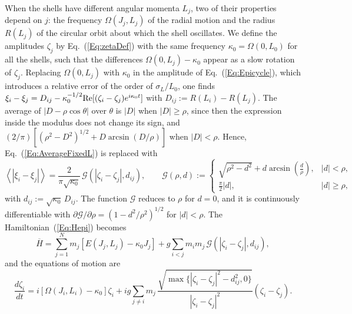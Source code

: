 When the shells have different angular momenta $L_j$, two of their properties depend on $j$: the frequency $\Omega(J_j,L_j)$ of the radial motion and the radius $R(L_j)$ of the circular orbit about which the shell oscillates. We define the amplitudes $\zeta_j$ by Eq.~(\ref{Eq:zetaDef}) with the same frequency $\kappa_0 = \Omega(0,L_0)$ for all the shells, such that the differences $\Omega(0,L_j) - \kappa_0$ appear as a slow rotation of $\zeta_j$. Replacing $\Omega(0,L_j)$ with $\kappa_0$ in the amplitude of Eq.~(\ref{Eq:Epicycle}), which introduces a relative error of the order of $\sigma_L/L_0$, one finds $\xi_i - \xi_j = D_{ij} - \kappa_0^{-1/2}\mbox{Re}[(\zeta_i - \zeta_j)e^{i\kappa_0 t}]$ with $D_{ij} := R(L_i) - R(L_j)$. The average of $|D - \rho\cos\theta|$ over $\theta$ is $|D|$ when $|D|\geq\rho$, since then the expression inside the modulus does not change its sign, and $(2/\pi)[(\rho^2 - D^2)^{1/2} + D\arcsin(D/\rho)]$ when $|D| < \rho$. Hence, Eq.~(\ref{Eq:AverageFixedL}) is replaced with
\begin{equation}
\left\langle \left| \xi_i - \xi_j \right| \right\rangle = \frac{2}{\pi\sqrt{\kappa_0}}\,\mathcal{G}\left( |\zeta_i - \zeta_j|,d_{ij} \right),\qquad
\mathcal{G}(\rho,d) := \left\{ \begin{array}{ll}
\sqrt{\rho^2 - d^2} + d\arcsin\left( \displaystyle\frac{d}{\rho} \right), & |d| < \rho,\\
\displaystyle\frac{\pi}{2}|d|, & |d|\geq\rho,
\end{array} \right.
\label{Eq:KernelL}
\end{equation}
with $d_{ij} := \sqrt{\kappa_0}\, D_{ij}$. The function $\mathcal{G}$ reduces to $\rho$ for $d = 0$, and it is continuously differentiable with $\partial\mathcal{G}/\partial\rho = (1 - d^2/\rho^2)^{1/2}$ for $|d| < \rho$. The Hamiltonian~(\ref{Eq:Hepi}) becomes
\begin{equation}
\overline{H} = \sum\limits_{j=1}^N m_j\left[ E(J_j,L_j) - \kappa_0 J_j \right] + g\sum\limits_{i<j} m_i m_j\,\mathcal{G}\left( |\zeta_i - \zeta_j|,d_{ij} \right),
\label{Eq:HepiL}
\end{equation}
and the equations of motion are
\begin{equation}
\frac{d\zeta_i}{dt} = i\left[ \Omega(J_i,L_i) - \kappa_0 \right]\zeta_i
 + i g\sum\limits_{j\neq i} m_j\,\frac{\sqrt{\max\{ |\zeta_i - \zeta_j|^2 - d_{ij}^2,0 \}}}{|\zeta_i - \zeta_j|^2}\left( \zeta_i - \zeta_j \right).
\label{Eq:EpicyclicL}
\end{equation}

